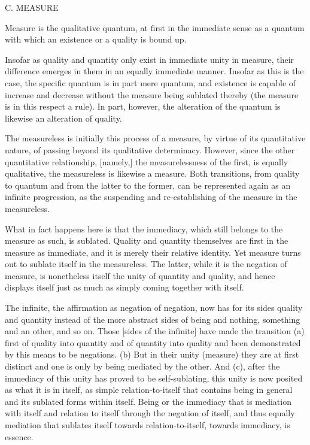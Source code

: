 C. MEASURE

Measure is the qualitative quantum,
at first in the immediate sense as a quantum
with which an existence or a quality is bound up.

Insofar as quality and quantity only exist in immediate unity in measure,
their difference emerges in them in an equally immediate manner.
Insofar as this is the case, the specific quantum is in part mere quantum,
and existence is capable of increase and decrease without the measure
being sublated thereby (the measure is in this respect a rule).
In part, however, the alteration of the quantum is
likewise an alteration of quality.

The measureless is initially this process of a measure,
by virtue of its quantitative nature,
of passing beyond its qualitative determinacy.
However, since the other quantitative relationship, [namely,]
the measurelessness of the first,
is equally qualitative,
the measureless is likewise a measure.
Both transitions, from quality to quantum
and from the latter to the former,
can be represented again as an infinite progression,
as the suspending and re-establishing of
the measure in the measureless.

What in fact happens here is that the immediacy,
which still belongs to the measure as such, is sublated.
Quality and quantity themselves are first
in the measure as immediate,
and it is merely their relative identity.
Yet measure turns out to sublate itself in the measureless.
The latter, while it is the negation of measure,
is nonetheless itself the unity of quantity and quality,
and hence displays itself just as much as
simply coming together with itself.

The infinite, the affirmation as negation of negation,
now has for its sides quality and quantity
instead of the more abstract sides of being and nothing,
something and an other, and so on.
Those [sides of the infinite] have made the transition
(a) first of quality into quantity
and of quantity into quality
and been demonstrated by this means to be negations.
(b) But in their unity (measure)
they are at first distinct
and one is only by being mediated by the other.
And (c), after the immediacy of this unity
has proved to be self-sublating,
this unity is now posited as what it is in itself,
as simple relation-to-itself that contains
being in general and its sublated forms within itself.
Being or the immediacy that is mediation with itself
and relation to itself through the negation of itself,
and thus equally mediation that sublates itself
towards relation-to-itself, towards immediacy, is essence.
